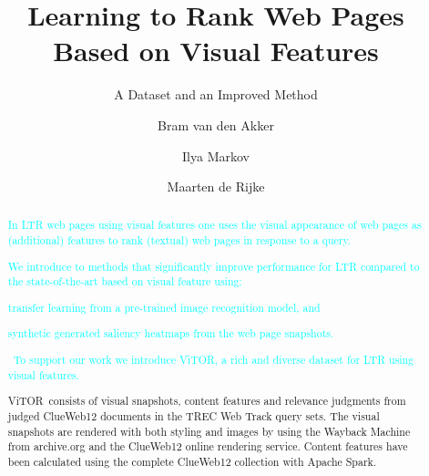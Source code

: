 \documentclass[sigconf,anonymous]{acmart}
\title{Learning to Rank Web Pages Based on Visual Features}
\subtitle{A Dataset and an Improved Method}
\author{Bram van den Akker}
\affiliation{%
  \institution{University of Amsterdam}
  \city{Amsterdam} 
  \country{The Netherlands}
}
\author{Ilya Markov}
\affiliation{%
  \institution{University of Amsterdam}
  \city{Amsterdam} 
  \country{The Netherlands}  
}
\author{Maarten de Rijke}
\affiliation{%
   \institution{University of Amsterdam}
   \city{Amsterdam} 
   \country{The Netherlands}
}
\newcommand{\mdr}[1]{\textcolor{cyan}{#1}}
\newcommand{\datasetname}{\ac{ViTOR}}
\begin{document}
\begin{abstract}
\mdr{In \ac{LTR} web pages using visual features one uses the visual appearance of web pages as (additional) features to rank (textual) web pages in response to a query.}
\mdr{We introduce to methods that significantly improve performance for \ac{LTR} compared to the state-of-the-art based on visual feature using: 
\begin{inparaenum}[(i)]
\item transfer learning from a pre-trained image recognition model, and
\item synthetic generated saliency heatmaps from the web page snapshots.
\end{inparaenum}\ 
To support our work we introduce \datasetname, a rich and diverse dataset for \ac{LTR} using visual features.} \datasetname~consists of visual snapshots, content features and relevance judgments from judged ClueWeb12 documents in the TREC Web Track query sets. The visual snapshots are rendered with both styling and images by using the Wayback Machine from archive.org and the ClueWeb12 online rendering service. Content features have been calculated using the complete ClueWeb12 collection with Apache Spark. 
\end{abstract}

%
%

\end{document}
